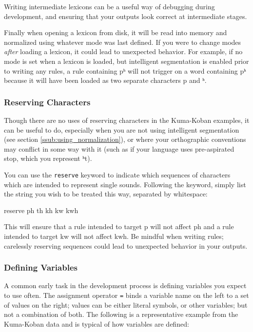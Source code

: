 \documentclass[10pt,letterpaper]{article}
\newcommand\textIPA[1]{{\fontIPA #1}}
\newcounter{excounter}
\newenvironment{vex}[1]{
  \vspace{1em}
  \refstepcounter{excounter}
  \noindent\makebox[3em][l]{(\arabic{excounter}\label{#1})}
  \minipage{\textwidth}
  \verbatim
}{
  \endverbatim
  \endminipage
  \vspace{1em}
}
\begin{document}
\noindent
Writing intermediate lexicons can be a useful way of debugging during development, and ensuring that your outputs look correct at intermediate stages.

Finally when opening a lexicon from disk, it will be read into memory and normalized using whatever mode was last defined. If you were to change modes \emph{after} loading a lexicon, it could lead to unexpected behavior. For example, if no mode is set when a lexicon is loaded, but intelligent segmentation is enabled prior to writing any rules, a rule containing \textIPA{pʰ} will not trigger on a word containing \textIPA{pʰ} because it will have been loaded as two separate characters \textIPA{p} and \textIPA{ʰ}. 


\subsubsection{Reserving Characters} 
\label{ssub:reserving_characters}
Though there are no uses of reserving characters in the Kuma-Koban examples, it can be useful to do, especially when you are not using intelligent segmentation (see section \ref{ssub:using_normalization}), or where your orthographic conventions may conflict in some way with it (such as if your language uses pre-aspirated stop, which you represent \textIPA{ʰt}).

You can use the \texttt{reserve} keyword to indicate which sequences of characters which are intended to represent single sounds. Following the keyword, simply list the string you wish to be treated this way, separated by whitespace:

\begin{vex}{ex:reserve}
reserve ph th kh kw kwh
\end{vex}

\noindent
This will ensure that a rule intended to target \textIPA{p} will not affect \textIPA{ph} and a rule intended to target \textIPA{kw} will not affect \textIPA{kwh}. Be mindful when writing rules; carelessly reserving sequences could lead to unexpected behavior in your outputs.


\subsubsection{Defining Variables}
\label{ssub:defining_variables}
A common early task in the development process is defining variables you expect to use often. The assignment operator \texttt{=} binds a variable name on the left to a set of values on the right; values can be either literal symbols, or other variables; but not a combination of both. The following is a representative example from the Kuma-Koban data and is typical of how variables are defined:
\end{document}
